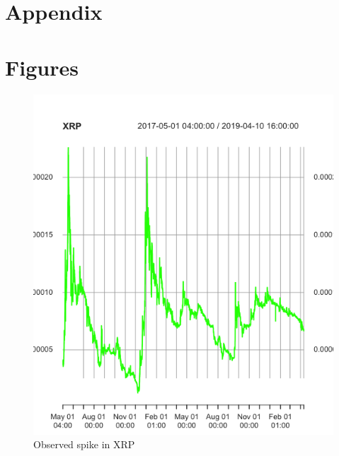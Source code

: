 \documentclass[a4paper,12pt]{article}
\begin{document}
\newpage

\section{Appendix}
\appendix
{}

\section{Figures}

\begin{figure}[htp]
  \centering
  \includegraphics[scale=0.5]{figures/xrp.png}
  \caption{Observed spike in XRP}
  \label{xrp}
\end{figure}
\end{document}
